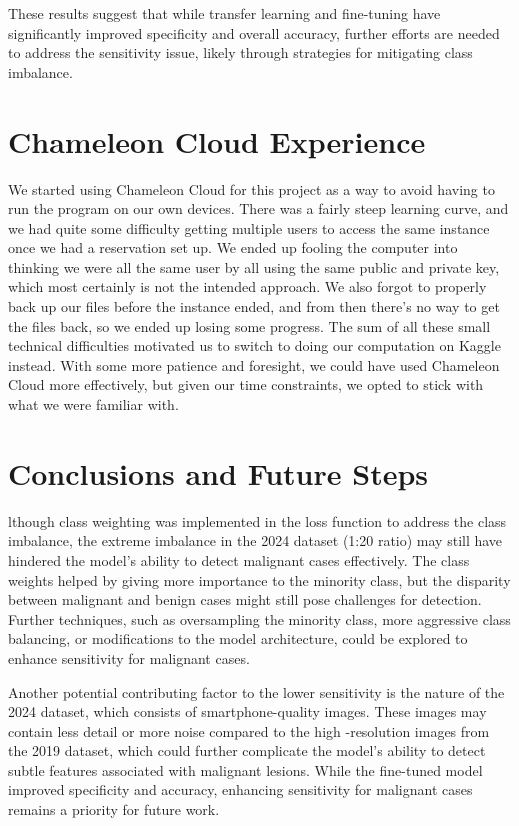 \documentclass{article}
\begin{document}
These results suggest that while transfer learning and fine-tuning have significantly improved specificity and overall
accuracy, further efforts are needed to address the sensitivity issue, likely through strategies for mitigating class
imbalance.

\section{Chameleon Cloud Experience}

We started using Chameleon Cloud for this project as a way to avoid having to run the program on our own devices. There was a fairly steep learning curve, and we had quite some difficulty getting multiple users to access the same instance once we had a reservation set up. We ended up fooling the computer into thinking we were all the same user by all using the same public and private key, which most certainly is not the intended approach. We also forgot to properly back up our files before the instance ended, and from then there’s no way to get the files back, so we ended up losing some progress. The sum of all these small technical difficulties motivated us to switch to doing our computation on Kaggle instead. With some more patience and foresight, we could have used Chameleon Cloud more effectively, but given our time constraints, we opted to stick with what we were familiar with.

\section{Conclusions and Future Steps}

lthough class weighting was implemented in the loss function to address the class imbalance, the extreme
imbalance in the 2024 dataset (1:20 ratio) may still have hindered the model’s ability to detect malignant cases
effectively. The class weights helped by giving more importance to the minority class, but the disparity between
malignant and benign cases might still pose challenges for detection. Further techniques, such as oversampling the
minority class, more aggressive class balancing, or modifications to the model architecture, could be explored to
enhance sensitivity for malignant cases.

Another potential contributing factor to the lower sensitivity is the nature of the 2024 dataset, which consists of
smartphone-quality images. These images may contain less detail or more noise compared to the high -resolution
images from the 2019 dataset, which could further complicate the model’s ability to detect subtle features associated
with malignant lesions. While the fine-tuned model improved specificity and accuracy, enhancing sensitivity for
malignant cases remains a priority for future work.
\end{document}
